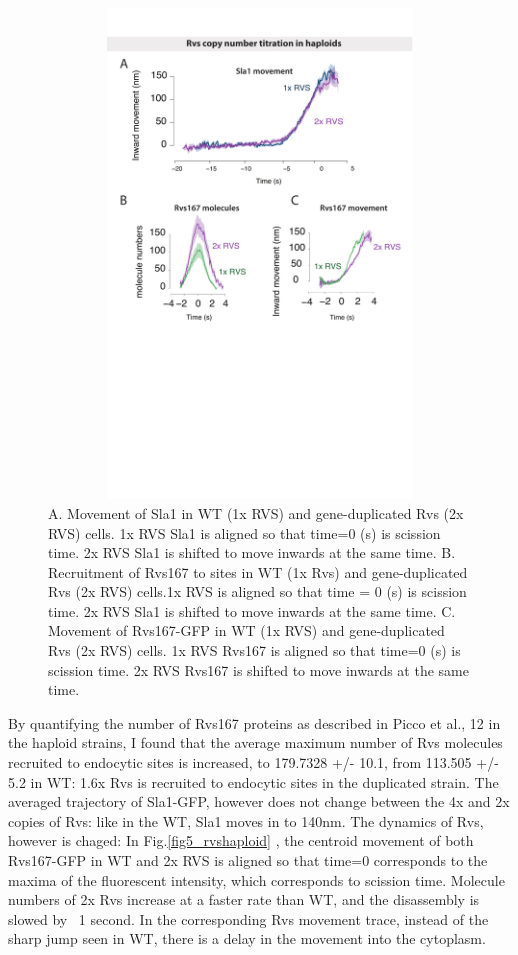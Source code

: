 				\vspace{5mm}
				\begin{figure}[h]
				\centering
				\includegraphics[width=13cm,height=13cm,keepaspectratio]{figures/results_final/rvs_haploid}
				\caption[Overexpression of the Rvs complex in haploid cells]
					{A. Movement of Sla1 in WT (1x RVS) and gene-duplicated Rvs (2x RVS) cells. 1x RVS Sla1 is aligned so that time=0 (s) is scission time. 2x RVS Sla1 is shifted to move inwards at the same time.
					B. Recruitment of Rvs167 to sites in WT (1x Rvs)  and gene-duplicated Rvs (2x RVS) cells.1x RVS is aligned so that time = 0 (s) is scission time. 2x RVS Sla1 is shifted to move inwards at the same time.
					C.  Movement of Rvs167-GFP in WT (1x RVS) and gene-duplicated Rvs (2x RVS) cells. 1x RVS Rvs167 is aligned so that time=0 (s) is scission time. 2x RVS Rvs167 is shifted to move inwards at the same time.
			 \label{fig_rvshaploid}}

				\end{figure}
		
		By quantifying the number of Rvs167 proteins as described in Picco et al., 12  in the haploid strains, I found that the average maximum number of Rvs molecules recruited to endocytic sites is increased, to 179.7328 +/- 10.1, from 113.505 +/- 5.2 in WT:  1.6x Rvs is recruited to endocytic sites in the duplicated strain. The averaged trajectory of Sla1-GFP, however does not change between the 4x and 2x copies of Rvs: like in the WT, Sla1 moves in to 140nm. The dynamics of Rvs, however is chaged: In Fig.\ref{fig5_rvshaploid} , the centroid movement of both Rvs167-GFP in WT and 2x RVS is aligned so that time=0 corresponds to the maxima of the fluorescent intensity, which corresponds to scission time. Molecule numbers of 2x Rvs increase at a faster rate than WT, and the disassembly is slowed by ~1 second. In the corresponding Rvs movement trace, instead of the sharp jump seen in WT, there is a delay in the movement into the cytoplasm.



